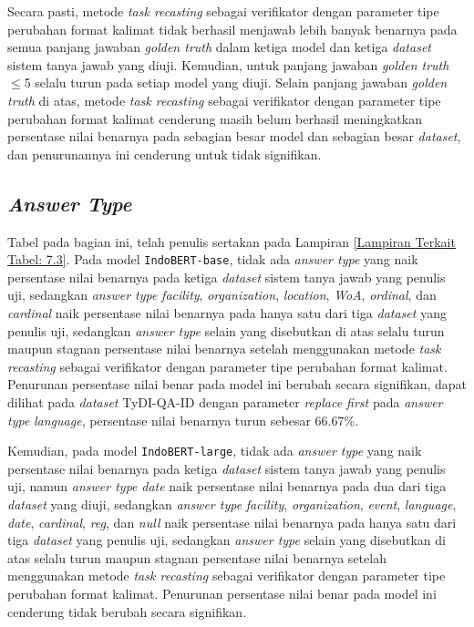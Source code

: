 Secara pasti, metode \emph{task recasting} sebagai verifikator dengan parameter tipe perubahan format kalimat tidak berhasil menjawab lebih banyak benarnya pada semua panjang jawaban \emph{golden truth} dalam ketiga model dan ketiga \emph{dataset} sistem tanya jawab yang diuji. Kemudian, untuk panjang jawaban \emph{golden truth} $\leq$5 selalu turun pada setiap model yang diuji. Selain panjang jawaban \emph{golden truth} di atas, metode \emph{task recasting} sebagai verifikator dengan parameter tipe perubahan format kalimat cenderung masih belum berhasil meningkatkan persentase nilai benarnya pada sebagian besar model dan sebagian besar \emph{dataset}, dan penurunannya ini cenderung untuk tidak signifikan.

\subsection{\emph{Answer Type}}
Tabel pada bagian ini, telah penulis sertakan pada Lampiran \ref{Lampiran Terkait Tabel: 7.3}. Pada model \texttt{IndoBERT-base}, tidak ada \emph{answer type} yang naik persentase nilai benarnya pada ketiga \emph{dataset} sistem tanya jawab yang penulis uji, sedangkan \emph{answer type} \emph{facility}, \emph{organization}, \emph{location}, \emph{WoA}, \emph{ordinal}, dan \emph{cardinal} naik persentase nilai benarnya pada hanya satu dari tiga \emph{dataset} yang penulis uji, sedangkan \emph{answer type} selain yang disebutkan di atas selalu turun maupun stagnan persentase nilai benarnya setelah menggunakan metode \emph{task recasting} sebagai verifikator dengan parameter tipe perubahan format kalimat. Penurunan persentase nilai benar pada model ini berubah secara signifikan, dapat dilihat pada \emph{dataset} TyDI-QA-ID dengan parameter \emph{replace first} pada \emph{answer type} \emph{language}, persentase nilai benarnya turun sebesar 66.67\%.

Kemudian, pada model \texttt{IndoBERT-large}, tidak ada \emph{answer type} yang naik persentase nilai benarnya pada ketiga \emph{dataset} sistem tanya jawab yang penulis uji, namun \emph{answer type} \emph{date} naik persentase nilai benarnya pada dua dari tiga \emph{dataset} yang diuji, sedangkan \emph{answer type} \emph{facility}, \emph{organization}, \emph{event}, \emph{language}, \emph{date}, \emph{cardinal}, \emph{reg}, dan \emph{null} naik persentase nilai benarnya pada hanya satu dari tiga \emph{dataset} yang penulis uji, sedangkan \emph{answer type} selain yang disebutkan di atas selalu turun maupun stagnan persentase nilai benarnya setelah menggunakan metode \emph{task recasting} sebagai verifikator dengan parameter tipe perubahan format kalimat. Penurunan persentase nilai benar pada model ini cenderung tidak berubah secara signifikan.


